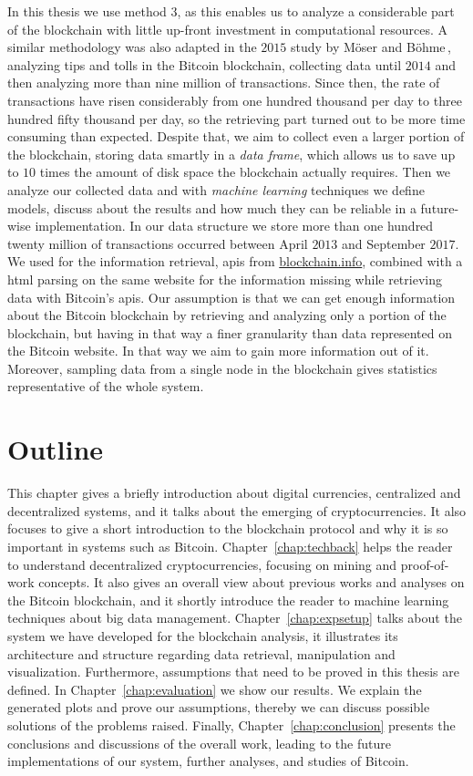 \documentclass[USenglish]{uit-thesis}
\begin{document}
In this thesis we use method $3$,
as this enables us to analyze a considerable
part of the blockchain with little up-front
investment in computational resources.
A similar methodology was also adapted
in the $2015$ study by
Möser and Böhme\,\cite{Moser2015},
analyzing tips and tolls in the Bitcoin blockchain,
collecting data until $2014$
and then analyzing more than
nine million of transactions.
Since then, the rate of transactions have
risen considerably from
one hundred thousand per day
to three hundred fifty thousand per day,
so the retrieving part turned
out to be more time consuming than expected.
Despite that, we aim to collect even
a larger portion of the blockchain, storing data smartly in a
\emph{data frame}, which allows us to save
up to $10$ times the amount of disk space
the blockchain actually
requires. Then we analyze our collected data
and with \emph{machine learning}
techniques we define models, discuss about
the results and how much they can be
reliable in a future-wise implementation.
In our data structure we store more than
one hundred twenty million of transactions occurred between
April $2013$ and September $2017$.
We used for the information retrieval, \gls{api}s
from \url{blockchain.info},
combined with a \gls{html} parsing on the same
website for the information missing while retrieving data with
Bitcoin's \gls{api}s.
Our assumption is that we can get enough information about the
Bitcoin blockchain by retrieving
and analyzing only a portion
of the blockchain, but having in that way a finer
granularity than data represented on the Bitcoin website.
In that way we aim to gain more information out of it.
Moreover, sampling data from a
single node in the blockchain gives statistics
representative of the whole system.
\section{Outline}
\label{sec:outline}
This chapter gives a briefly introduction about digital currencies,
centralized and decentralized systems, and it talks about the
emerging of cryptocurrencies. It also focuses to give
a short introduction to the blockchain protocol and
why it is so important in systems such as Bitcoin.
Chapter~\ref{chap:techback} helps the reader
to understand decentralized cryptocurrencies,
focusing on mining and proof-of-work concepts.
It also gives an overall view about previous works
and analyses on the Bitcoin blockchain, and it shortly
introduce the reader to machine learning techniques about
big data management.
Chapter~\ref{chap:expsetup} talks about the system
we have developed for the blockchain analysis, it illustrates
its architecture and structure regarding data
retrieval, manipulation and visualization.
Furthermore, assumptions that need to be
proved in this thesis are defined.
In Chapter~\ref{chap:evaluation} we show our results.
We explain the generated plots and prove our assumptions,
thereby we can discuss possible solutions of the problems
raised.
Finally, Chapter~\ref{chap:conclusion} presents
the conclusions and discussions of the overall work,
leading to the future implementations of our system,
further analyses, and studies of Bitcoin.
\end{document}
